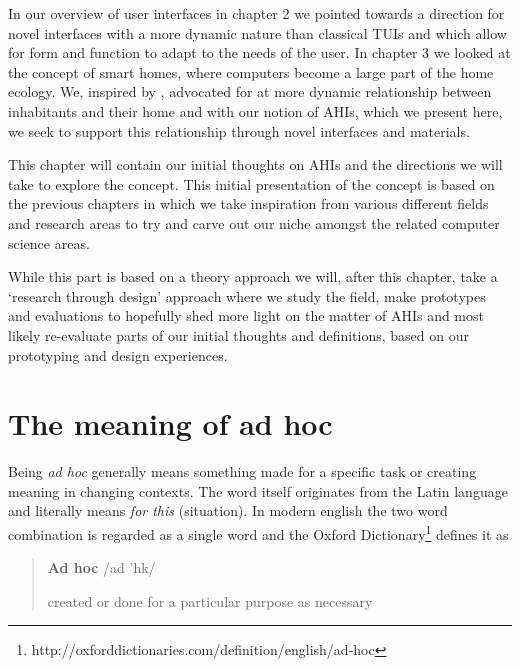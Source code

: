 

In our overview of user interfaces in chapter 2 we pointed towards a direction for novel interfaces with a more dynamic nature than classical TUIs and which allow for form and function to adapt to the needs of the user.
In chapter 3 we looked at the concept of smart homes, where computers become a large part of the home ecology. 
We, inspired by \citet{brand1995buildings}, advocated for at more dynamic relationship between inhabitants and their home and with our notion of AHIs, which we present here, we seek to support this relationship through novel interfaces and materials.

This chapter will contain our initial thoughts on AHIs and the directions we will take to explore the concept.
This initial presentation of the concept is based on the previous chapters in which we take inspiration from various different fields and research areas to try and carve out our niche amongst the related computer science areas.

While this part is based on a theory approach we will, after this chapter, take a `research through design' approach where we study the field, make prototypes and evaluations to hopefully shed more light on the matter of AHIs and most likely re-evaluate parts of our initial thoughts and definitions, based on our prototyping and design experiences. 

\section{The meaning of ad hoc}

Being \emph{ad hoc} generally means something made for a specific task or creating meaning in changing contexts.
The word itself originates from the Latin language and literally means \emph{for this} (situation). 
In modern english the two word combination is regarded as a single word and the Oxford Dictionary\footnote{http://oxforddictionaries.com/definition/english/ad-hoc} defines it as

\begin{quotation}
\textbf{Ad hoc}  /ad 'h\textturnscripta k/

created or done for a particular purpose as necessary
\end{quotation}

